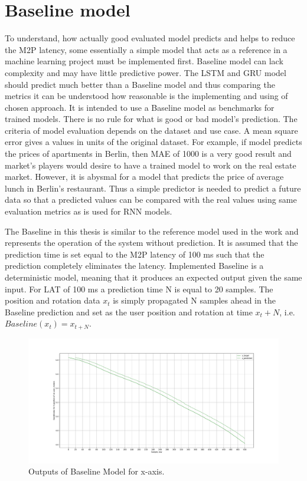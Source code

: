 \section{Baseline model}
\label{sec:eval:baseline}
To understand, how actually good evaluated model predicts and helps to reduce the M2P latency, some essentially a simple model that acts as a reference in a machine learning project must be implemented first. Baseline model can lack complexity and may have little predictive power. The LSTM and GRU model should predict much better than a Baseline model and thus comparing the metrics it can be understood how reasonable is the implementing and using of chosen approach. It is intended to use a Baseline model as benchmarks for trained models. There is no rule for what is good or bad model's prediction. The criteria of model evaluation depends on the dataset and use case. A mean square error gives a values in units of the original dataset. For example, if model predicts the prices of apartments in Berlin, then MAE of 1000 is a very good result and market's players would desire to have a trained model to work on the real estate market. However, it is abysmal for a model that predicts the price of average lunch in Berlin's restaurant. Thus a simple predictor is needed to predict a future data so that a predicted values can be compared with the real values using same evaluation metrics as is used for RNN models.

The Baseline in this thesis is similar to the reference model used in the work \cite{serhan_kalman} and represents the operation of the system without prediction. It is assumed that the prediction time is set equal to the M2P latency of 100 ms such that the prediction completely eliminates the latency. Implemented Baseline is a deterministic model, meaning that it produces an expected output given the same input. For LAT of 100 ms a prediction time N is equal to 20 samples. The position and rotation data $x_t$ is simply propagated N samples ahead in the Baseline prediction and set as the user position and rotation at time $x_t + N$, i.e. $Baseline(x_t) = x_{t+N}$. 
\begin{figure}[htb]
	\begin{center}
		\includegraphics[width=1\textwidth, keepaspectratio]{gfx/base_zoom-x.pdf}
		\caption{\label{fig:base_x} Outputs of Baseline Model for x-axis.}
	\end{center}
\end{figure}

